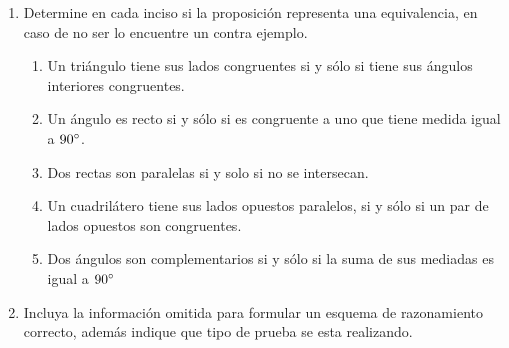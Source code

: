 {\begin{enumerate}
\begin{enumerate}
\item Si una persona camina se acalora. 
\item Si dos rectas se intersecan, son paralelas. 
\item Si una persona es adinerada, entonces puede viajar. 
\item si $a=0$ y $b=0$, entonces $a.b=0$, para todo $a$ y $b$ reales. 
\item Si un polinomio es un triángulo, entonces una región plana. 
\item Dos planos paralelos si intersecan. 
\end{enumerate}
\item Determine en cada inciso si la proposición representa una equivalencia,
en caso de no ser lo encuentre un contra ejemplo. 

\begin{enumerate}
\item Un triángulo tiene sus lados congruentes si y sólo si tiene sus ángulos
interiores congruentes. 
\item Un ángulo es recto si y sólo si es congruente a uno que tiene medida
igual a $90^\circ$. 
\item Dos rectas son paralelas si y solo si no se intersecan. 
\item Un cuadrilátero tiene sus lados opuestos paralelos, si y sólo si un
par de lados opuestos son congruentes. 
\item Dos ángulos son complementarios si y sólo si la suma de sus mediadas
es igual a $90^\circ$ 
\end{enumerate}
\item Incluya la información omitida para formular un esquema de razonamiento
correcto, además indique que tipo de prueba se esta realizando. 


\end{enumerate}}

